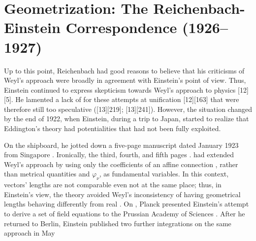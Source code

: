 \documentclass[draft]{article}
\newcommand{\phin}{\ensuremath{\varphi_\nu}\xspace}
\begin{document}
\section{Geometrization: The Reichenbach-Einstein Correspondence (1926--1927)}
\label{geometrization}
%
Up to this point, Reichenbach had good reasons to believe that his criticisms of Weyl's approach were broadly in agreement with Einstein's point of view. Thus, Einstein continued to express skepticism towards Weyl's  approach to physics  [12][5]. He lamented a lack of  for these attempts at unification [12][163] that were therefore still too speculative ([13][219]; [13][241]). However, the situation changed by the end of 1922, when Einstein, during a trip to Japan, started to realize that Eddington's theory had potentialities that had not been fully exploited. 

On the shipboard, he jotted down a five-page manuscript dated January 1923 from Singapore . Ironically, the third, fourth, and fifth pages  \citep{Reichenbach1921}. \citet{Eddington1921} had extended Weyl's approach by using only the coefficients of an affine connection \Gtmn, rather than metrical quantities \gmn and \phin, as fundamental variables. In this context, vectors' lengths are not comparable even not at the same place; thus, in Einstein's view, the theory avoided Weyl's inconsistency of having geometrical lengths behaving differently from real \rac. On , Planck presented Einstein's attempt to derive a set of field equations to the Prussian Academy of Sciences \citep{Einstein1923c}. After he returned to Berlin, Einstein published two further integrations on the same approach in May \cite{Einstein1923c,Einstein1923e}
\end{document}
